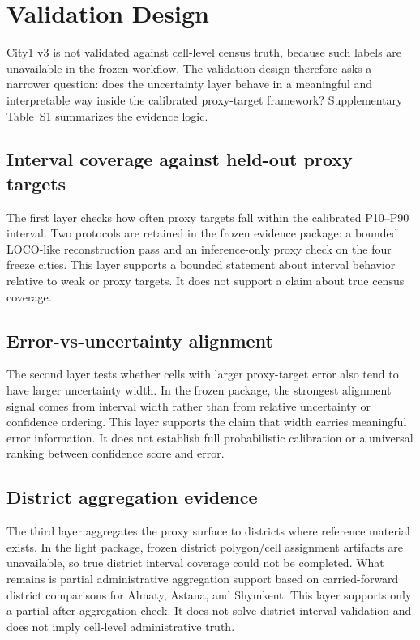 \section{Validation Design}

City1 v3 is not validated against cell-level census truth, because such labels are unavailable in the frozen workflow. The validation design therefore asks a narrower question: does the uncertainty layer behave in a meaningful and interpretable way inside the calibrated proxy-target framework? Supplementary Table~S1 summarizes the evidence logic.

\subsection{Interval coverage against held-out proxy targets}

The first layer checks how often proxy targets fall within the calibrated P10--P90 interval. Two protocols are retained in the frozen evidence package: a bounded LOCO-like reconstruction pass and an inference-only proxy check on the four freeze cities. This layer supports a bounded statement about interval behavior relative to weak or proxy targets. It does not support a claim about true census coverage.

\subsection{Error-vs-uncertainty alignment}

The second layer tests whether cells with larger proxy-target error also tend to have larger uncertainty width. In the frozen package, the strongest alignment signal comes from interval width rather than from relative uncertainty or confidence ordering. This layer supports the claim that width carries meaningful error information. It does not establish full probabilistic calibration or a universal ranking between confidence score and error.

\subsection{District aggregation evidence}

The third layer aggregates the proxy surface to districts where reference material exists. In the light package, frozen district polygon/cell assignment artifacts are unavailable, so true district interval coverage could not be completed. What remains is partial administrative aggregation support based on carried-forward district comparisons for Almaty, Astana, and Shymkent. This layer supports only a partial after-aggregation check. It does not solve district interval validation and does not imply cell-level administrative truth.

